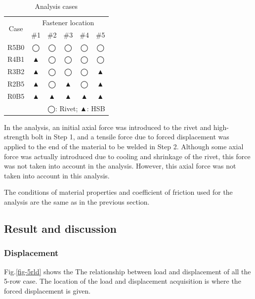 \begin{table}[htbp]
\centering
\caption{Analysis cases}\label{tab-5rcase}
\begin{tabular}{@{}cccccc@{}}
\toprule
\multirow{2}{*}{Case} & \multicolumn{5}{c}{Fastener location} \\ \cmidrule(l){2-6} 
                      & \#1   & \#2   & \#3   & \#4   & \#5   \\ \midrule
R5B0                   & ◯     & ◯     & ◯     & ◯     & ◯     \\
R4B1                   & ▲     & ◯     & ◯     & ◯     & ◯     \\
R3B2                   & ▲     &◯     & ◯     & ◯     & ▲     \\
R2B5                   & ▲     & ◯     & ▲     & ◯     & ▲     \\
R0B5                   & ▲     & ▲     & ▲     & ▲     & ▲     \\ \midrule
\multicolumn{6}{r}{◯: Rivet; ▲: HSB}
\end{tabular}
\end{table}

In the analysis, an initial axial force was introduced to the rivet and high-strength bolt in Step 1, and a tensile force due to forced displacement was applied to the end of the material to be welded in Step 2. Although some axial force was actually introduced due to cooling and shrinkage of the rivet, this force was not taken into account in the analysis. However, this axial force was not taken into account in this analysis.

The conditions of material properties and coefficient of friction used for the analysis are the same as in the previous section.

\subsection{Result and discussion}

\subsubsection{Displacement}

Fig.\ref{fig-5rld} shows the The relationship between load and displacement of all the 5-row case. The location of the load and displacement acquisition is where the forced displacement is given.

